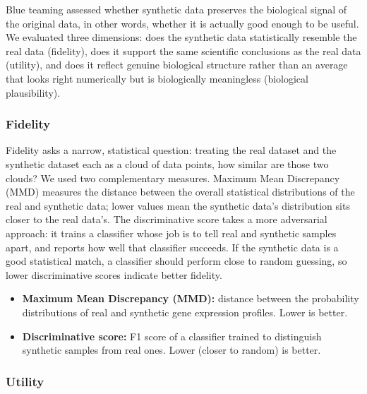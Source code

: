 Blue teaming assessed whether synthetic data preserves the biological signal of the original data, in other words, whether it is actually good enough to be useful. We evaluated three dimensions: does the synthetic data statistically resemble the real data (fidelity), does it support the same scientific conclusions as the real data (utility), and does it reflect genuine biological structure rather than an average that looks right numerically but is biologically meaningless (biological plausibility).

\subsubsection{Fidelity}

Fidelity asks a narrow, statistical question: treating the real dataset and the synthetic dataset each as a cloud of data points, how similar are those two clouds? We used two complementary measures. Maximum Mean Discrepancy (MMD) measures the distance between the overall statistical distributions of the real and synthetic data; lower values mean the synthetic data's distribution sits closer to the real data's. The discriminative score takes a more adversarial approach: it trains a classifier whose job is to tell real and synthetic samples apart, and reports how well that classifier succeeds. If the synthetic data is a good statistical match, a classifier should perform close to random guessing, so lower discriminative scores indicate better fidelity.

\begin{technicalbox}[title={Fidelity metrics used}]
  \begin{itemize}
    \item \textbf{Maximum Mean Discrepancy (MMD):} distance between the
          probability distributions of real and synthetic gene expression
          profiles. Lower is better.
    \item \textbf{Discriminative score:} F1 score of a classifier trained
          to distinguish synthetic samples from real ones. Lower (closer
          to random) is better.
  \end{itemize}
\end{technicalbox}

\subsubsection{Utility}

